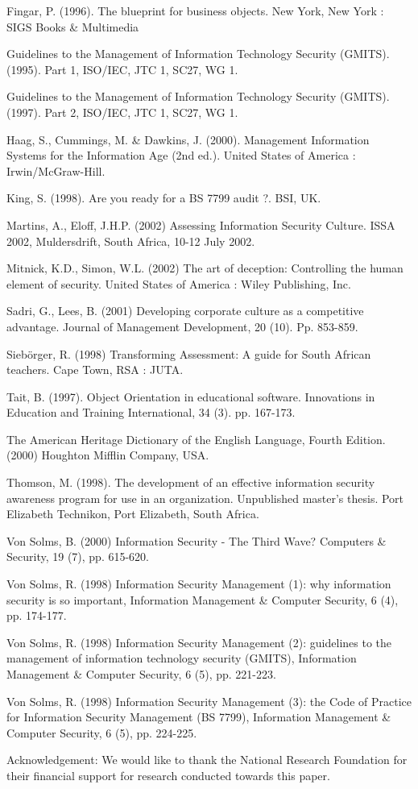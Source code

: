 Fingar, P. (1996). The blueprint for business objects. New York,
New York : SIGS Books \& Multimedia

Guidelines to the Management of Information Technology Security
(GMITS). (1995). Part 1, ISO/IEC, JTC 1, SC27, WG 1.

Guidelines to the Management of Information Technology Security
(GMITS). (1997). Part 2, ISO/IEC, JTC 1, SC27, WG 1.

Haag, S., Cummings, M. \& Dawkins, J. (2000). Management
Information Systems for the Information Age (2nd ed.). United
States of America : Irwin/McGraw-Hill.

King, S. (1998). Are you ready for a BS 7799 audit ?. BSI, UK.

Martins, A., Eloff, J.H.P. (2002) Assessing Information Security
Culture. ISSA 2002, Muldersdrift, South Africa, 10-12 July 2002.

Mitnick, K.D., Simon, W.L. (2002) The art of deception:
Controlling the human element of security. United States of
America : Wiley Publishing, Inc.

Sadri, G., Lees, B. (2001) Developing corporate culture as a
competitive advantage. Journal of Management Development, 20 (10).
Pp. 853-859.

Siebörger, R. (1998) Transforming Assessment: A guide for South
African teachers. Cape Town, RSA : JUTA.

Tait, B. (1997). Object Orientation in educational software.
Innovations in Education and Training International, 34 (3). pp.
167-173.

The American Heritage Dictionary of the English Language, Fourth
Edition. (2000) Houghton Mifflin Company, USA.

Thomson, M. (1998). The development of an effective information
security awareness program for use in an organization. Unpublished
master's thesis. Port Elizabeth Technikon, Port Elizabeth, South
Africa.

Von Solms, B. (2000) Information Security - The Third Wave?
Computers \& Security, 19 (7), pp. 615-620.

Von Solms, R. (1998) Information Security Management (1): why
information security is so important, Information Management \&
Computer Security, 6 (4), pp. 174-177.

Von Solms, R. (1998) Information Security Management (2):
guidelines to the management of information technology security
(GMITS), Information Management \& Computer Security, 6 (5), pp.
221-223.

Von Solms, R. (1998) Information Security Management (3): the Code
of Practice for Information Security Management (BS 7799),
Information Management \& Computer Security, 6 (5), pp. 224-225.

Acknowledgement: We would like to thank the National Research
Foundation for their financial support for research conducted
towards this paper.
